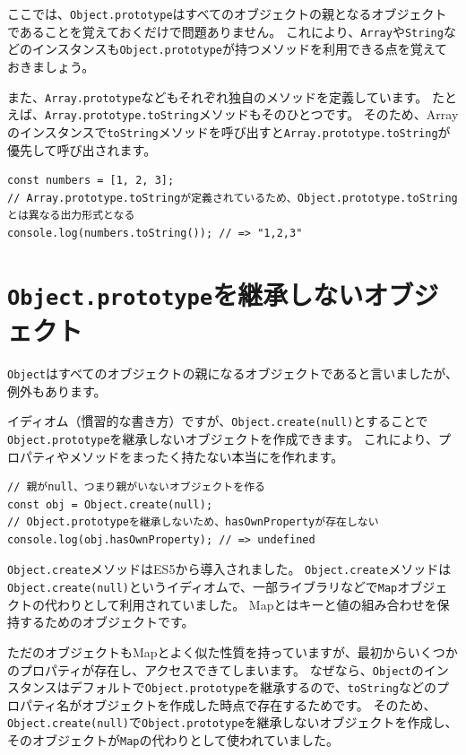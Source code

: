 ここでは、\texttt{Object.prototype}はすべてのオブジェクトの親となるオブジェクトであることを覚えておくだけで問題ありません。
これにより、\texttt{Array}や\texttt{String}などのインスタンスも\texttt{Object.prototype}が持つメソッドを利用できる点を覚えておきましょう。

また、\texttt{Array.prototype}などもそれぞれ独自のメソッドを定義しています。
たとえば、\texttt{Array.prototype.toString}メソッドもそのひとつです。
そのため、Arrayのインスタンスで\texttt{toString}メソッドを呼び出すと\texttt{Array.prototype.toString}が優先して呼び出されます。

\begin{lstlisting}
const numbers = [1, 2, 3];
// Array.prototype.toStringが定義されているため、Object.prototype.toStringとは異なる出力形式となる
console.log(numbers.toString()); // => "1,2,3"
\end{lstlisting}

\hypertarget{not-inherit-object}{%
\section{\texttt{Object.prototype}を継承しないオブジェクト}\label{not-inherit-object}}

\texttt{Object}はすべてのオブジェクトの親になるオブジェクトであると言いましたが、例外もあります。

イディオム（慣習的な書き方）ですが、\texttt{Object.create(null)}とすることで\texttt{Object.prototype}を継承しないオブジェクトを作成できます。
これにより、プロパティやメソッドをまったく持たない本当に\textbf{}を作れます。

\begin{lstlisting}
// 親がnull、つまり親がいないオブジェクトを作る
const obj = Object.create(null);
// Object.prototypeを継承しないため、hasOwnPropertyが存在しない
console.log(obj.hasOwnProperty); // => undefined
\end{lstlisting}

\texttt{Object.create}メソッドはES5から導入されました。
\texttt{Object.create}メソッドは\texttt{Object.create(null)}というイディオムで、一部ライブラリなどで\texttt{Map}オブジェクトの代わりとして利用されていました。
Mapとはキーと値の組み合わせを保持するためのオブジェクトです。

ただのオブジェクトもMapとよく似た性質を持っていますが、最初からいくつかのプロパティが存在し、アクセスできてしまいます。
なぜなら、\texttt{Object}のインスタンスはデフォルトで\texttt{Object.prototype}を継承するので、\texttt{toString}などのプロパティ名がオブジェクトを作成した時点で存在するためです。
そのため、\texttt{Object.create(null)}で\texttt{Object.prototype}を継承しないオブジェクトを作成し、そのオブジェクトが\texttt{Map}の代わりとして使われていました。

